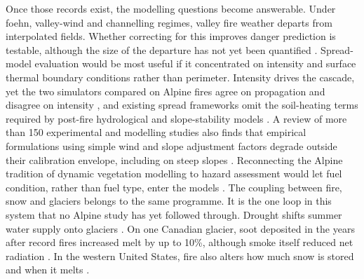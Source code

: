 \documentclass[11pt,a4paper]{article}
\begin{document}
Once those records exist, the modelling questions become answerable. Under foehn, valley-wind and channelling regimes, valley fire weather departs from interpolated fields. Whether correcting for this improves danger prediction is testable, although the size of the departure has not yet been quantified \citep{ozaki_impact_2022, sharples_overview_2009}. Spread-model evaluation would be most useful if it concentrated on intensity and surface thermal boundary conditions rather than perimeter. Intensity drives the cascade, yet the two simulators compared on Alpine fires agree on propagation and disagree on intensity \citep{malanchini_modeling_2025}, and existing spread frameworks omit the soil-heating terms required by post-fire hydrological and slope-stability models \citep{or_review_2023}. A review of more than 150 experimental and modelling studies also finds that empirical formulations using simple wind and slope adjustment factors degrade outside their calibration envelope, including on steep slopes \citep{hayajneh_wind_2026}. Reconnecting the Alpine tradition of dynamic vegetation modelling to hazard assessment would let fuel condition, rather than fuel type, enter the models \citep{schumacher_relative_2006, hillebrand_contrasting_2023, muller_towards_2020}. The coupling between fire, snow and glaciers belongs to the same programme. It is the one loop in this system that no Alpine study has yet followed through. Drought shifts summer water supply onto glaciers \citep{leone_20222023_2026}. On one Canadian glacier, soot deposited in the years after record fires increased melt by up to 10\%, although smoke itself reduced net radiation \citep{aubrywake_fire_2022}. In the western United States, fire also alters how much snow is stored and when it melts \citep{koshkin_wildfire_2022}.
\end{document}
